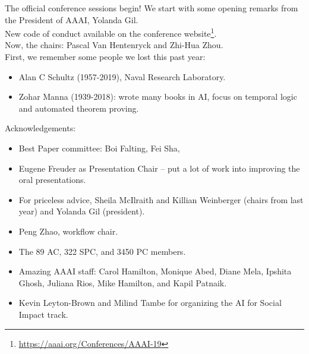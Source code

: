 The official conference sessions begin! We start with some opening remarks from the President of AAAI, Yolanda Gil. \\

New code of conduct available on the conference website\footnote{\url{https://aaai.org/Conferences/AAAI-19}}. \\

Now, the chairs: Pascal Van Hentenryck and Zhi-Hua Zhou. \\

First, we remember some people we lost this past year:
\begin{itemize}
    \item Alan C Schultz (1957-2019), Naval Research Laboratory. 
    \item Zohar Manna (1939-2018): wrote many books in AI, focus on temporal logic and automated theorem proving.
\end{itemize}

Acknowledgements:
\begin{itemize}
    \item Best Paper committee: Boi Falting, Fei Sha, 
    \item Eugene Freuder as Presentation Chair -- put a lot of work into improving the oral presentations.
    \item For priceless advice, Sheila McIlraith and Killian Weinberger (chairs from last year) and Yolanda Gil (president).
    \item Peng Zhao, workflow chair.
    \item The 89 AC, 322 SPC, and 3450 PC members.
    \item Amazing AAAI staff: Carol Hamilton, Monique Abed, Diane Mela, Ipshita Ghosh, Juliana Rios, Mike Hamilton, and Kapil Patnaik.
    \item Kevin Leyton-Brown and Milind Tambe for organizing the AI for Social Impact track.
\end{itemize}

